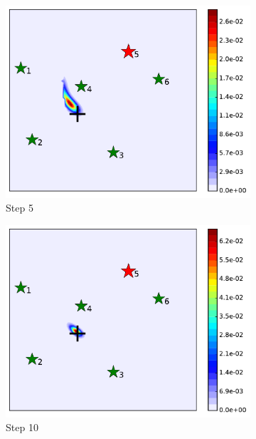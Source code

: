 \documentclass[journal]{IEEEtranTIE}
\theoremstyle{remark}
\begin{document}
\begin{figure}
\begin{subfigure}[b]{0.21\textwidth}
			\includegraphics[width=\textwidth]{hetero_sta_sen_sta_tar_rbt5_step5_16-TIE-3798}
			\caption{Step 5}\label{fig:htr_sta_sen_sta_tar_sing3}
		\end{subfigure}
		\begin{subfigure}[b]{0.21\textwidth}
			\includegraphics[width=\textwidth]{hetero_sta_sen_sta_tar_rbt5_step10_16-TIE-3798}
			\caption{Step 10}\label{fig:htr_sta_sen_sta_tar_sing4}
		\end{subfigure}
		\begin{subfigure}[b]{0.21\textwidth}

\end{subfigure}
\end{figure}
\end{document}
